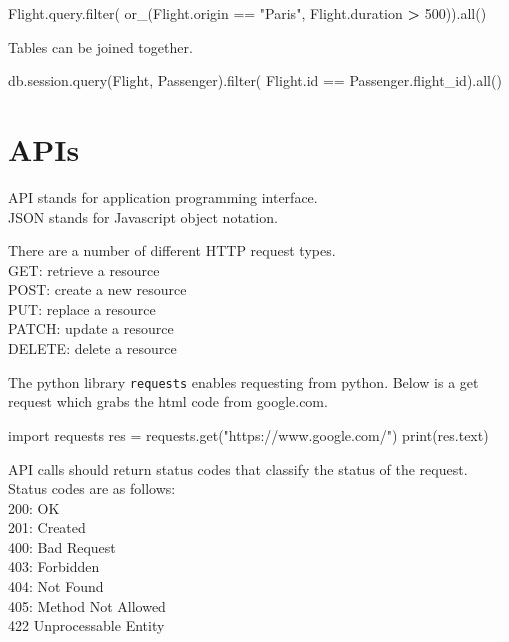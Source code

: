 \documentclass[]{book}
\newenvironment{Shaded}{\begin{snugshade}}{\end{snugshade}}
\newcommand{\ExtensionTok}[1]{#1}
\newcommand{\NormalTok}[1]{#1}
\newcommand{\OperatorTok}[1]{\textcolor[rgb]{0.81,0.36,0.00}{\textbf{#1}}}
\newcommand{\StringTok}[1]{\textcolor[rgb]{0.31,0.60,0.02}{#1}}
\begin{document}
\begin{Shaded}
\begin{Highlighting}[]
\ExtensionTok{Flight.query.filter}\NormalTok{(}
    \ExtensionTok{or_}\NormalTok{(Flight.origin == }\StringTok{"Paris"}\NormalTok{,}
        \ExtensionTok{Flight.duration} \OperatorTok{>}\NormalTok{ 500))}\ExtensionTok{.all}\NormalTok{()}
\end{Highlighting}
\end{Shaded}

Tables can be joined together.

\begin{Shaded}
\begin{Highlighting}[]
\ExtensionTok{db.session.query}\NormalTok{(Flight, Passenger)}\ExtensionTok{.filter}\NormalTok{(}
    \ExtensionTok{Flight.id}\NormalTok{ == Passenger.flight_id)}\ExtensionTok{.all}\NormalTok{()}
\end{Highlighting}
\end{Shaded}

\hypertarget{apis}{%
\section{APIs}\label{apis}}

API stands for application programming interface.\\
JSON stands for Javascript object notation.

There are a number of different HTTP request types.\\
GET: retrieve a resource\\
POST: create a new resource\\
PUT: replace a resource\\
PATCH: update a resource\\
DELETE: delete a resource

The python library \texttt{requests} enables requesting from python. Below is a get request which grabs the html code from google.com.

\begin{Shaded}
\begin{Highlighting}[]
\ExtensionTok{import}\NormalTok{ requests}
\ExtensionTok{res}\NormalTok{ = requests.get(}\StringTok{"https://www.google.com/"}\NormalTok{)}
\ExtensionTok{print}\NormalTok{(res.text)                              }
\end{Highlighting}
\end{Shaded}

API calls should return status codes that classify the status of the request.\\
Status codes are as follows:\\
200: OK\\
201: Created\\
400: Bad Request\\
403: Forbidden\\
404: Not Found\\
405: Method Not Allowed\\
422 Unprocessable Entity
\end{document}
